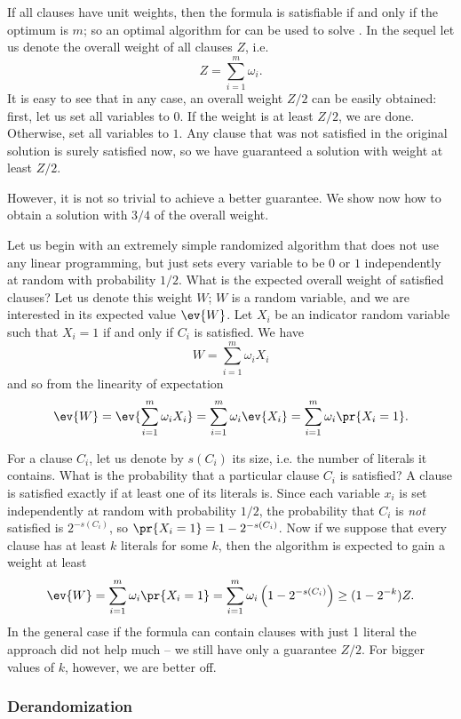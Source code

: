 \noindent
If all clauses have unit weights, then the formula is satisfiable if and only if the optimum is $m$;
so an optimal algorithm for \maxsat can be used to solve \sat. In the sequel let us denote the 
overall weight of all clauses $Z$, i.e. $$Z=\sum_{i=1}^m\omega_i.$$
It is easy to see that in any case, an overall weight $Z/2$ can be easily obtained: first, let us set all 
variables to $0$. If the weight is at least $Z/2$, we are done. Otherwise, set all variables to $1$.
Any clause that was not satisfied in the original solution is surely satisfied now, so we have guaranteed
a solution with weight at least $Z/2$.

However, it is not so trivial to achieve a better guarantee. We show now how to obtain a solution with
$3/4$ of the overall weight.

\noindent
Let us begin with an extremely simple randomized algorithm  that does not use any linear programming,
but just sets every variable to be $0$ or $1$ independently at random with probability $1/2$. What is 
the expected overall weight of satisfied clauses? Let us denote this weight $W$; $W$ is a random variable,
and we are interested in its expected value
$\ev{W}$.
Let $X_i$ be an indicator random variable such that $X_i=1$ if and only if $C_i$ is satisfied.
We have
$$W=\sum_{i=1}^m\omega_iX_i$$
and so from the linearity of expectation
$$\ev{W}=\ev{\sum_{i=1}^m\omega_iX_i}=\sum_{i=1}^m\omega_i\ev{X_i}
=\sum_{i=1}^m\omega_i\pr{X_i=1}.$$

\noindent
For a clause $C_i$, let us denote by $s(C_i)$ its size, i.e. the number of literals it contains. 
What is the probability that a particular clause $C_i$ is satisfied? A clause is satisfied exactly if at least
one of its literals is. Since each variable $x_i$ is set independently at random with probability $1/2$,
the probability that $C_i$ is {\em not} satisfied is $2^{-s(C_i)}$, so 
$\pr{X_i=1}=1-2^{-s(C_i)}$. Now if we suppose that every clause has at least $k$ literals for some $k$, 
then the algorithm  is expected to gain a weight at least 
\begin{equation}
\label{eq:maxsat:A1}
\ev{W}=\sum_{i=1}^m\omega_i\pr{X_i=1}=\sum_{i=1}^m\omega_i\left(1-2^{-s(C_i)}\right)\ge(1-2^{-k})Z.
\end{equation}
In the general case if the formula can contain clauses with just 1 literal the approach did not help much
-- we still have only a guarantee $Z/2$. For bigger values of $k$, however, we are better off.

\subsubsection*{Derandomization}

